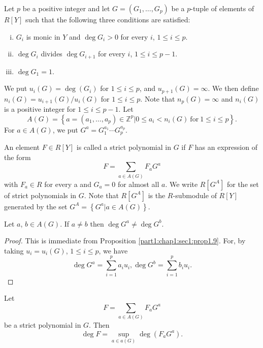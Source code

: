 Let $p$ be a positive integer and let $G= (G_1 , \ldots , G_p)$ be a $p$-tuple of elements of $R[Y]$ such that the following three conditions are satisfied:
\begin{enumerate}[(i)]
\item $G_i$ is monic in $Y$ and $\deg G_i > 0$ for every $i$, $1 \leq i \leq p$.
  \item $\deg G_i$ divides $\deg G_{i+1}$ for every $i$, $1 \leq i \leq p-1$.
    \item $\deg G_1 =1$.
\end{enumerate}

We put $u_i (G)=\deg(G_i)$ for $1 \leq i \leq p$, and $u_{p+1}(G)=\infty$. We then define $n_i (G)= u_{i+1}(G)/ u_i (G)$ for $1 \leq i \leq p$. Note that $n_p (G)=\infty$ and $n_i (G)$ is a positive integer for $1\leq i \leq p-1$. Let
$$
A (G)= \left\{ a= (a_1 , \ldots , a_p) \in \mathbb{Z}^p \Big| 0 \leq a_i < n_i (G) ~\text{for}~ 1 \leq i \leq p \right\}.
$$
For $a \in A(G)$, we put $G^a= G^{a_1}_{1}\cdots G_{p}^{a_p}$.

\setcounter{thm}{2}
\begin{defi}\label{part1:chap1:sec2:def2.3}
An element $F \in R [Y]$ is called a strict polynomial in $G$ if $F$ has an expression of the form 
$$
F = \sum_{a \in A(G)} F_a G^a
$$
with $F_a \in R$ for every a and $G_a =0$ for almost all $a$. We write $R [G^A]$ for the set of strict polynomials in $G$. Note that $R[G^A]$ is the $R$-submodule of $R[Y]$ generated by the set $G^A= \left\{ G^a \Big| a \in A (G) \right\}$.
\end{defi}

\begin{lemma}\label{part1:chap1:sec2:lem2.4}
  Let $a$, $b \in A (G)$. If $a \neq b$ then $\deg G^a \neq \deg G^b$.
\end{lemma}

\begin{proof}
  This is immediate from Proposition \ref{part1:chap1:sec1:prop1.9}. For, by taking $u_i = u_i (G)$, $1 \leq i \leq p$, we have
$$
\deg G^a = \sum^p _{i=1} a_i u_i, \deg G^b = \sum^p_{i=1} b_i u_i.
$$
\end{proof}

\begin{coro}\label{part1:chap1:sec2:coro2.5}
  Let\pageoriginale 
  $$
  F = \sum_{a \in A (G)} F_a G^a
  $$
  be a strict polynomial in $G$. Then
  $$
  \deg F = \sup\limits_{a \in a (G)} \deg (F_a G^a).
  $$
\end{coro}

